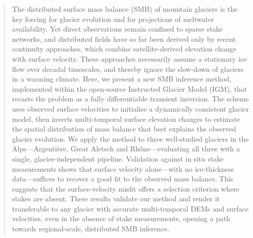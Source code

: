 \begin{abstract}
	The distributed surface mass balance (SMB) of mountain glaciers is the key
	forcing for glacier evolution and for projections of meltwater availability.
	Yet direct observations remain confined to sparse stake networks, and distributed
	fields have so far been derived only by recent continuity approaches, which combine
	satellite-derived elevation change with surface velocity. These approaches
	necessarily assume a stationary ice flow over decadal timescales, and thereby
	ignore the slow-down of glaciers in a warming climate.
	Here, we present a new SMB inference method, implemented within the open-source Instructed Glacier
	Model (IGM), that recasts the problem as a fully differentiable transient
	inversion. The scheme uses observed surface velocities to initialise a
	dynamically consistent glacier model, then inverts multi-temporal surface
	elevation changes to estimate the spatial distribution of mass balance that best
	explains the observed glacier evolution. We apply the method to three
	well-studied glaciers in the Alps---Argenti\`ere, Great Aletsch and
	Rh\^one---evaluating all three with a single, glacier-independent pipeline.
	Validation against in situ stake measurements shows that surface velocity
	alone---with no ice-thickness data---suffices to recover a good fit to the observed
	mass balance. This suggests that the surface-velocity misfit offers a selection
	criterion where stakes are absent.
	These results validate our method
	and render it transferable to any glacier with accurate multi-temporal DEMs and
	surface velocities, even in the absence of stake measurements, opening a path
	towards regional-scale, distributed SMB inference.
\end{abstract}